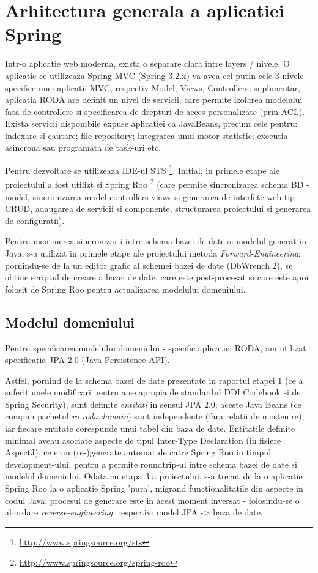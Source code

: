 \section{Arhitectura generala a aplicatiei Spring}

Intr-o aplicatie web moderna, exista o separare clara intre layers /
nivele. O aplicatie ce utilizeaza Spring MVC (Spring 3.2.x) va avea cel putin
cele 3 nivele specifice unei aplicatii MVC, respectiv Model, Views, Controllers; 
suplimentar, aplicatia RODA are definit un nivel de servicii, 
care permite izolarea modelului fata de controllere si specificarea de drepturi de acces personalizate (prin ACL). 
Exista servicii disponibile expuse aplicatiei ca JavaBeans, precum cele pentru: 
indexare si cautare; file-repository; 
integrarea unui motor statistic; 
executia asincrona sau programata de task-uri etc.


Pentru dezvoltare se utilizeaza IDE-ul STS
\footnote{\url{http://www.springsource.org/sts}}.
Initial, in primele etape ale proiectului a fost utilizt si Spring Roo
\footnote{\url{http://www.springsource.org/spring-roo}}
(care permite sincronizarea schema BD - model, sincronizarea model-controllers-views si generarea de
interfete web tip CRUD, adaugarea de servicii si componente, structurarea proiectului si generarea de configuratii).

Pentru mentinerea sincronizarii intre schema bazei de date si modelul generat
in Java, s-a utilizat in primele etape ale proiectului metoda \emph{Forward-Engineering}: 
pornindu-se de la un editor grafic al schemei bazei de date (DbWrench 2), %
se obtine scriptul de creare a bazei de date, 
care este post-procesat si care este apoi folosit de Spring Roo pentru
actualizarea modelului domeniului.

\subsection{Modelul domeniului}
Pentru specificarea modelului domeniului - specific aplicatiei RODA, 
am utilizat specificatia JPA 2.0 (Java Persistence API).

Astfel, pornind de la schema bazei de date prezentate in raportul etapei 1 (ce
a suferit unele modificari pentru a se apropia de standardul DDI Codebook si
de Spring Security), sunt definite \emph{entitati} in sensul JPA 2.0; 
aceste Java Beans (ce compun pachetul \emph{ro.roda.domain}) 
sunt independente (fara relatii de mostenire),
iar fiecare entitate corespunde unui tabel din baza de date. 
Entitatile definite minimal aveau asociate 
aspecte de tipul Inter-Type Declaration (in fisiere AspectJ), 
ce erau (re-)generate automat de catre Spring Roo in timpul development-ului, 
pentru a permite roundtrip-ul intre schema bazei de date si modelul domeniului.
Odata cu etapa 3 a proiectului, s-a trecut de la o aplicatie Spring Roo 
la o aplicatie Spring 'pura', 
migrand functionalitatile din aspecte in codul Java; 
procesul de generare este in acest moment inversat - 
folosindu-se o abordare \emph{reverse-engineering}, respectiv: model JPA -> baza de date. 


